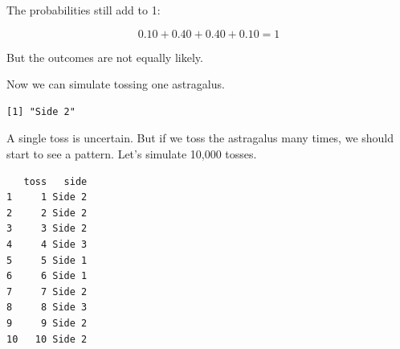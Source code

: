 \documentclass[
  letterpaper,
  DIV=11,
  numbers=noendperiod]{scrreprt}
\newenvironment{Shaded}{\begin{snugshade}}{\end{snugshade}}
\newcommand{\AttributeTok}[1]{\textcolor[rgb]{0.40,0.45,0.13}{#1}}
\newcommand{\ConstantTok}[1]{\textcolor[rgb]{0.56,0.35,0.01}{#1}}
\newcommand{\DecValTok}[1]{\textcolor[rgb]{0.68,0.00,0.00}{#1}}
\newcommand{\FunctionTok}[1]{\textcolor[rgb]{0.28,0.35,0.67}{#1}}
\newcommand{\NormalTok}[1]{\textcolor[rgb]{0.00,0.23,0.31}{#1}}
\newcommand{\OtherTok}[1]{\textcolor[rgb]{0.00,0.23,0.31}{#1}}
\newcommand{\SpecialCharTok}[1]{\textcolor[rgb]{0.37,0.37,0.37}{#1}}
\begin{document}
The probabilities still add to 1:

\[0.10 + 0.40 + 0.40 + 0.10 = 1\]

But the outcomes are not equally likely.

Now we can simulate tossing one astragalus.

\begin{Shaded}
\end{Shaded}

\begin{verbatim}
[1] "Side 2"
\end{verbatim}

A single toss is uncertain. But if we toss the astragalus many times, we
should start to see a pattern. Let's simulate 10,000 tosses.

\begin{Shaded}
\end{Shaded}

\begin{verbatim}
   toss   side
1     1 Side 2
2     2 Side 2
3     3 Side 2
4     4 Side 3
5     5 Side 1
6     6 Side 1
7     7 Side 2
8     8 Side 3
9     9 Side 2
10   10 Side 2
\end{verbatim}
\end{document}
